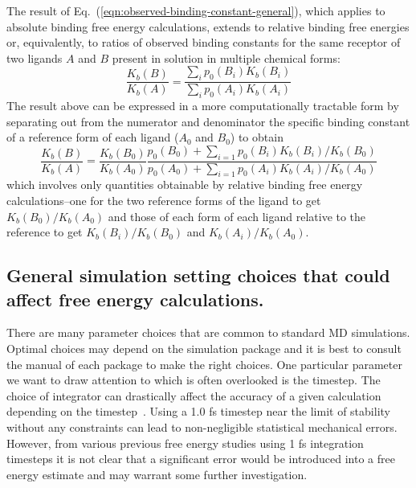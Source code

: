 \documentclass[9pt,bestpractices]{livecoms}
\begin{document}
The result of Eq.~(\ref{eqn:observed-binding-constant-general}), which applies to absolute binding free energy calculations, extends to relative binding free energies or, equivalently, to ratios of observed binding constants for the same receptor of two ligands $A$ and $B$ present in solution in multiple chemical forms:
\begin{equation}
  \frac{K_b(B)}{K_b(A)} = \frac{\sum_i p_0(B_i) K_b(B_i)}{\sum_i p_0(A_i) K_b(A_i)}
  \label{eqn:observed-binding-constant-ratio}
\end{equation}
The result above can be expressed in a more computationally tractable form by separating out from the numerator and denominator the specific binding constant of a reference form of each ligand ($A_0$ and $B_0$) to obtain\cite{de2018rigorous}
\begin{equation}
 \frac{K_b(B)}{K_b(A)} = \frac{K_b(B_0)}{K_b(A_0)} \frac{
 p_0(B_0) + \sum_{i=1} p_0(B_i) K_b(B_i)/K_b(B_0)
 }{
p_0(A_0) + \sum_{i=1} p_0(A_i) K_b(A_i)/K_b(A_0)
 }
\end{equation}
which involves only quantities obtainable by relative binding free energy calculations--one for the two reference forms of the ligand to get  $K_b(B_0)/K_b(A_0)$ and those of each form of each ligand relative to the reference to get $K_b(B_i)/K_b(B_0)$ and $K_b(A_i)/K_b(A_0)$.

\subsection{General simulation setting choices that could affect free energy calculations.}
There are many parameter choices that are common to standard MD simulations. Optimal choices may depend on the simulation package and it is best to consult the manual of each package to make the right choices. One particular parameter we want to draw attention to which is often overlooked is the timestep. The choice of integrator can drastically affect the accuracy of a given calculation depending on the timestep~\cite{leimkuhler2016efficient}. Using a 1.0 fs timestep near the limit of stability without any constraints can lead to non-negligible statistical mechanical errors. However, from various previous free energy studies using 1 fs integration timesteps it is not clear that a significant error would be introduced into a free energy estimate and may warrant some further investigation.  
\end{document}
